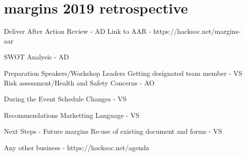 \documentclass[11pt,agenda]{meetingmins}
\begin{document}
\maketitle

\section{margins 2019 retrospective}
\begin{items}
	\item Deliver After Action Review - AD
		\subitem Link to AAR - https://hacksoc.net/margins-aar
	\item SWOT Analysis - AD
	\item Preparation
		\subitem Speakers/Workshop Leaders Getting designated team member - VS
		\subitem Risk assessment/Health and Safety Concerns - AO
	\item During the Event
		\subitem Schedule Changes - VS
	\item Recommendations
		\subitem Marketting Language - VS
	\item Next Steps - Future margins
		\subitem Re-use of existing document and forms - VS
	\item Any other business - https://hacksoc.net/agenda
\end{items}

\vspace{1em}
\end{document}
